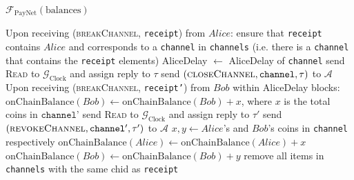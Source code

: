 \begin{functionality}{$\mathcal{F}_{\mathrm{PayNet}}
\left(\mathrm{balances}\right)$}
\begin{algorithmic}[1]
    \State Upon receiving (\textsc{breakChannel}, \texttt{receipt}) from $Alice$:
    \Indent
      \State ensure that \texttt{receipt} contains $Alice$ and corresponds to a
      \texttt{channel} in \texttt{channels} (i.e. there is a \texttt{channel}
      that contains the \texttt{receipt} elements)
      \State AliceDelay $\gets$ AliceDelay of \texttt{channel}
      \State send \textsc{Read} to $\mathcal{G}_{\mathrm{Clock}}$ and assign
      reply to $\tau$
      \State send $\left(\textsc{closeChannel}, \mathtt{channel},
      \tau\right)$ to $\mathcal{A}$
      \State Upon receiving (\textsc{breakChannel}, \texttt{receipt'}) from
      $Bob$ within AliceDelay blocks: 
        \State $\mathrm{onChainBalance}\left(Bob\right) \gets
        \mathrm{onChainBalance}\left(Bob\right) + x$, where $x$ is the total
        coins in $\texttt{channel'}$
        \State send \textsc{Read} to $\mathcal{G}_{\mathrm{Clock}}$ and assign
        reply to $\tau'$
        \State send $\left(\textsc{revokeChannel}, \mathtt{channel'},
        \tau'\right)$ to $\mathcal{A}$
      \Else
        \State $x, y \gets Alice$'s and $Bob$'s coins in \texttt{channel}
        respectively
        \State $\mathrm{onChainBalance}\left(Alice\right) \gets
        \mathrm{onChainBalance}\left(Alice\right) + x$
        \State $\mathrm{onChainBalance}\left(Bob\right) \gets
        \mathrm{onChainBalance}\left(Bob\right) + y$
      \EndIf
      \State remove all items in \texttt{channels} with the same chid as
      \texttt{receipt}
    \EndIndent
  \end{algorithmic}
\end{functionality}

